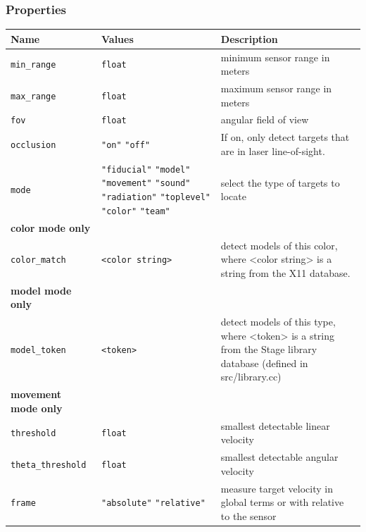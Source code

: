 \documentclass[11pt,twoside]{report}
\begin{document}
\subsubsection*{Properties}
\begin{tabularx}{\columnwidth}{lXX}
\hline Name & Values & Description \\ \hline 
\verb'min_range' & \verb'float' & minimum sensor range in meters\\ 
\verb'max_range' & \verb'float' & maximum sensor range in meters\\ 
\verb'fov' & \verb'float' & angular field of view\\ 
\verb'occlusion' & \verb'"on"' \verb'"off"' & If on, only detect targets that are in laser line-of-sight.\\ 
\verb'mode' & \verb'"fiducial"' \verb'"model"'
\verb'"movement"' \verb'"sound"' \verb'"radiation"' \verb'"toplevel"'
\verb'"color"' \verb'"team"' & select the type of targets to locate\\

{\bf color mode only}\\
\verb'color_match' & \verb'<color string>' & detect models of this color, where <color string> is a string from the X11 database.\\
{\bf model mode only}\\
\verb'model_token' & \verb'<token>' & detect models of this type, where  <token> is a string from the Stage library database (defined in src/library.cc)\\ 
{\bf movement mode only}\\
\verb'threshold' & \verb'float' & smallest detectable linear velocity\\
\verb'theta_threshold' & \verb'float' & smallest detectable angular velocity\\
\verb'frame' & \verb'"absolute"' \verb'"relative"' & measure target velocity in global terms or with relative to the sensor\\  
\hline
\end{tabularx}
\end{document}
